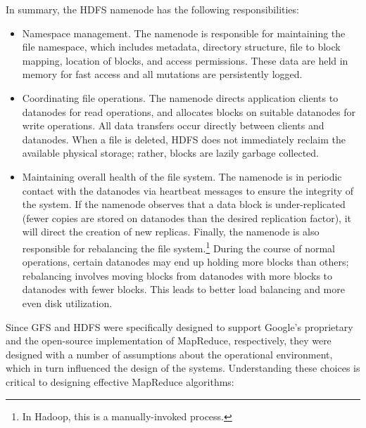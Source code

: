 In summary, the HDFS namenode has the following responsibilities:

\begin{itemize}

\item Namespace management.  The namenode is responsible for
  maintaining the file namespace, which includes metadata, directory
  structure, file to block mapping, location of blocks, and access
  permissions.  These data are held in memory for fast access and all
  mutations are persistently logged.

\item Coordinating file operations.  The namenode directs application
  clients to datanodes for read operations, and allocates blocks on
  suitable datanodes for write operations.  All data transfers occur
  directly between clients and datanodes.  When a file is deleted,
  HDFS does not immediately reclaim the available physical storage;
  rather, blocks are lazily garbage collected.

\item Maintaining overall health of the file system. The namenode is
  in periodic contact with the datanodes via heartbeat messages to
  ensure the integrity of the system.  If the namenode observes that a
  data block is under-replicated (fewer copies are stored on datanodes
  than the desired replication factor), it will direct the creation of
  new replicas.  Finally, the namenode is also responsible for
  rebalancing the file system.\footnote{In Hadoop, this is a
  manually-invoked process.}  During the course of normal operations,
  certain datanodes may end up holding more blocks than others;
  rebalancing involves moving blocks from datanodes with more blocks
  to datanodes with fewer blocks.  This leads to better load balancing
  and more even disk utilization.

\end{itemize}

\noindent Since GFS and HDFS were specifically designed to support
Google's proprietary and the open-source implementation of MapReduce,
respectively, they were designed with a number of assumptions about
the operational environment, which in turn influenced the design of
the systems.  Understanding these choices is critical to designing
effective MapReduce algorithms:

